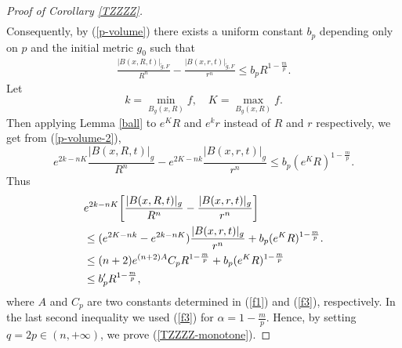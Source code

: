 \documentclass[11pt]{amsart}
\numberwithin{equation}{section}
\begin{document}
\begin{proof}[Proof of Corollary \ref{TZZZZ}]
\begin{align*}
	\end{align*}
Consequently,  by (\ref{p-volume}) there exists a uniform constant $b_p$ depending only on $p$ and the initial metric $g_0$ such that
	\begin{align}\label{p-volume-2}
	\frac{|B(x,R,t)|_{\tilde{g},F}}{R^n}-\frac{|B(x,r,t)|_{\tilde{g},F}}{r^n}\leq b_pR^{1-\frac{m}{p}}.
	\end{align}
 Let
\[
k=\min_{B_g(x,R)}f,\quad K=\max_{B_g(x,R)}f.
\]
 Then  applying  Lemma \ref{ball} to $e^K R$ and $e^k r$  instead of $R$ and $r$ respectively,  
 we get from (\ref{p-volume-2}), 
\[
e^{2k-nK}\frac{|B(x,R,t)|_g}{R^n}-e^{2K-nk}\frac{|B(x,r,t)|_g}{r^n}\leq b_p ( e^KR)^{1-\frac{m}{p}}.
\]
Thus
\begin{align}
&e^{2k-nK}\bigg[\frac{|B(x,R,t)|_g}{R^n}-\frac{|B(x,r,t)|_g}{r^n}\bigg]\notag\\
&\le (e^{2K-nk}-e^{2k-nK})\frac{|B(x,r,t)|_g}{r^n}
+ b_p(e^KR)^{1-\frac{m}{p}}.\notag\\
&\le  (n+2)e^{(n+2)A}C_p R^{1-\frac{m}{p}}+b_p (e^KR)^{1-\frac{m}{p}}\notag\\
&\le b_p'R^{1-\frac{m}{p}},\notag
\end{align}
where $A$ and $C_p$ are two constants determined in (\ref{f1}) and (\ref{f3}), respectively.
In the last second inequality we used (\ref{f3}) for $\alpha=1-\frac{m}{p}$. 
Hence,  by setting $q=2p\in (n,+\infty)$,   we prove (\ref{TZZZZ-monotone}).
\end{proof}
\end{document}
